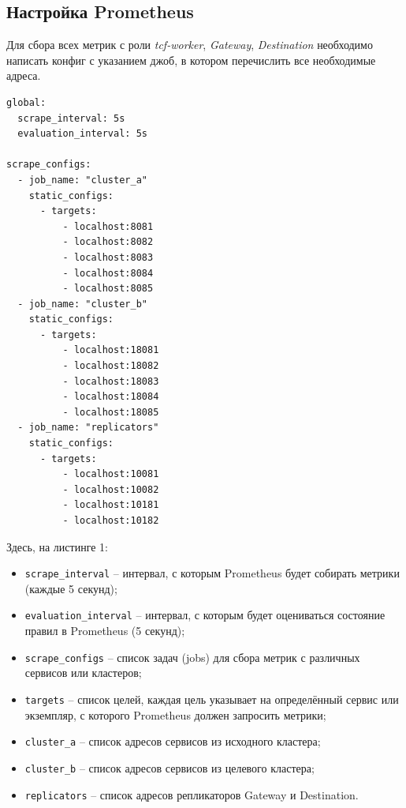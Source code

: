 \subsection{Настройка Prometheus}

Для сбора всех метрик с роли \textit{tcf-worker}, \textit{Gateway}, \textit{Destination} необходимо
написать конфиг с указанием джоб, в котором перечислить все необходимые адреса.

\begin{lstlisting}[frame=rlbt,caption={Пример конфигурации панели мониторинга для Prometheus}]
global:
  scrape_interval: 5s
  evaluation_interval: 5s
 
scrape_configs:
  - job_name: "cluster_a"
    static_configs:
      - targets:
          - localhost:8081
          - localhost:8082
          - localhost:8083
          - localhost:8084
          - localhost:8085
  - job_name: "cluster_b"
    static_configs:
      - targets:
          - localhost:18081
          - localhost:18082
          - localhost:18083
          - localhost:18084
          - localhost:18085
  - job_name: "replicators"
    static_configs:
      - targets:
          - localhost:10081
          - localhost:10082
          - localhost:10181
          - localhost:10182
\end{lstlisting}

Здесь, на листинге 1:

\begin{itemize}
  \item \texttt{scrape\_interval} -- интервал, с которым Prometheus будет собирать метрики (каждые 5 секунд);
  \item \texttt{evaluation\_interval} -- интервал, с которым будет оцениваться состояние правил в Prometheus (5 секунд);
  \item \texttt{scrape\_configs} -- список задач (jobs) для сбора метрик с различных сервисов или кластеров;
  \item \texttt{targets} -- список целей, каждая цель указывает на определённый сервис или экземпляр, с которого Prometheus должен запросить метрики;
  \item \texttt{cluster\_a} -- список адресов сервисов из исходного кластера;
  \item \texttt{cluster\_b} -- список адресов сервисов из целевого кластера;
  \item \texttt{replicators} -- список адресов репликаторов Gateway и Destination.
\end{itemize}

